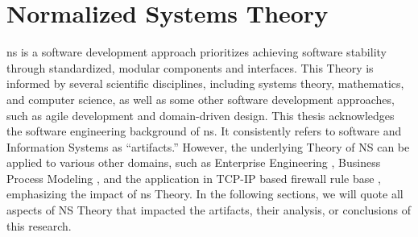 \section{Normalized Systems Theory} \label{sec_ns_theory}

\gls{ns} is a software development approach prioritizes achieving software stability
through standardized, modular components and interfaces. This Theory is informed by
several scientific disciplines, including systems theory, mathematics, and computer
science, as well as some other software development approaches, such as agile development
and domain-driven design. This thesis acknowledges the software engineering background of
\gls{ns}. It consistently refers to software and Information Systems as
\enquote{artifacts.} However, the underlying Theory of NS can be applied to various other
domains, such as Enterprise Engineering \parencite{huysmans_towards_2013}, Business
Process Modeling \parencite{nuel_towards_2011}, and the application in TCP-IP based
firewall rule base \parencite{haerens_evolvability_2021}, emphasizing the impact of
\gls{ns} Theory. In the following sections, we will quote all aspects of NS Theory that
impacted the artifacts, their analysis, or conclusions of this research.







